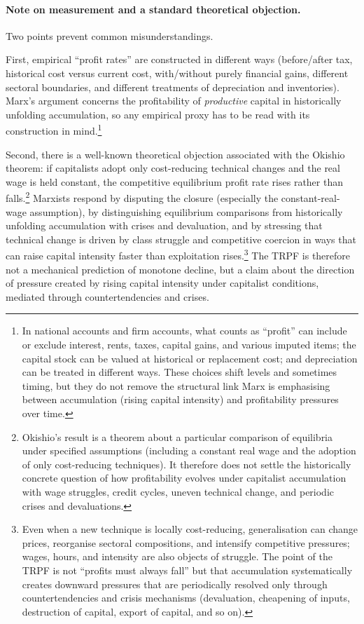 \paragraph{Note on measurement and a standard theoretical objection.}
Two points prevent common misunderstandings.

First, empirical ``profit rates'' are constructed in different ways (before/after tax, historical cost versus current cost,
with/without purely financial gains, different sectoral boundaries, and different treatments of depreciation and inventories).
Marx's argument concerns the profitability of \emph{productive} capital in historically unfolding accumulation, so any empirical proxy
has to be read with its construction in mind.\cite{Shaikh2016,Roberts2015}\footnote{In national accounts and firm accounts, what counts as ``profit'' can include or exclude interest, rents, taxes, capital gains, and various imputed items; the capital stock can be valued at historical or replacement cost; and depreciation can be treated in different ways. These choices shift levels and sometimes timing, but they do not remove the structural link Marx is emphasising between accumulation (rising capital intensity) and profitability pressures over time.}

Second, there is a well-known theoretical objection associated with the Okishio theorem: if capitalists adopt only cost-reducing
technical changes and the real wage is held constant, the competitive equilibrium profit rate rises rather than falls.\cite{Okishio1961}\footnote{Okishio’s result is a theorem about a particular comparison of equilibria under specified assumptions (including a constant real wage and the adoption of only cost-reducing techniques). It therefore does not settle the historically concrete question of how profitability evolves under capitalist accumulation with wage struggles, credit cycles, uneven technical change, and periodic crises and devaluations.}
Marxists respond by disputing the closure (especially the constant-real-wage assumption), by distinguishing equilibrium comparisons
from historically unfolding accumulation with crises and devaluation, and by stressing that technical change is driven by class struggle
and competitive coercion in ways that can raise capital intensity faster than exploitation rises.\footnote{Even when a new technique is locally cost-reducing, generalisation can change prices, reorganise sectoral compositions, and intensify competitive pressures; wages, hours, and intensity are also objects of struggle. The point of the TRPF is not ``profits must always fall'' but that accumulation systematically creates downward pressures that are periodically resolved only through countertendencies and crisis mechanisms (devaluation, cheapening of inputs, destruction of capital, export of capital, and so on).}
The TRPF is therefore not a mechanical
prediction of monotone decline, but a claim about the direction of pressure created by rising capital intensity under capitalist conditions,
mediated through countertendencies and crises.

